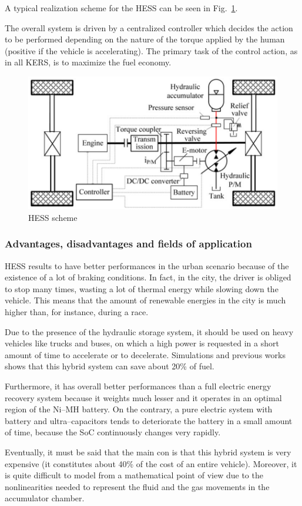 \documentclass[11pt]{article}
\begin{document}
A typical realization scheme for the HESS can be seen in Fig.~\ref{HESS scheme}.

The overall system is driven by a centralized controller which decides the action to be performed depending on the nature of the torque applied by the human (positive if the vehicle is accelerating). The primary task of the control action, as in all KERS, is to maximize the fuel economy.

\begin{figure}[H]
\centering
\includegraphics[width=.6\textwidth]{Images/State_of_the_art/HESS Scheme.PNG}
\caption{HESS scheme}
\label{HESS scheme}
\end{figure}
\subsubsection{Advantages, disadvantages and fields of application}

HESS results to have better performances in the urban scenario because of the existence of a lot of braking conditions. In fact, in the city, the driver is obliged to stop many times, wasting a lot of thermal energy while slowing down the vehicle. This means that the amount of renewable energies in the city is much higher than, for instance, during a race. 

Due to the presence of the hydraulic storage system, it should be used on heavy vehicles like trucks and buses, on which a high power is requested in a short amount of time to accelerate or to decelerate. Simulations and previous works shows that this hybrid system can save about 20\% of fuel.

Furthermore, it has overall better performances than a full electric energy recovery system because it weights much lesser and it operates in an optimal region of the Ni--MH battery. On the contrary, a pure electric system with battery and ultra--capacitors tends to deteriorate the battery in a small amount of time, because the SoC continuously changes very rapidly.

Eventually, it must be said that the main con is that this hybrid system is very expensive (it constitutes about 40\% of the cost of an entire vehicle). Moreover, it is quite difficult to model from a mathematical point of view due to the nonlinearities needed to represent the fluid and the gas movements in the accumulator chamber.
\end{document}
